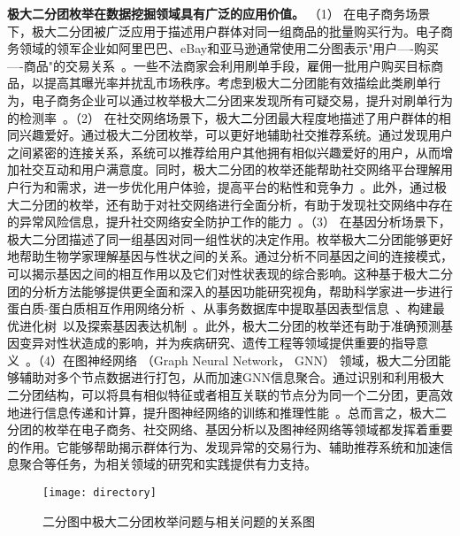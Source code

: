 \textbf{极大二分团枚举在数据挖掘领域具有广泛的应用价值。} （1） 在电子商务场景下，极大二分团被广泛应用于描述用户群体对同一组商品的批量购买行为。电子商务领域的领军企业如阿里巴巴、eBay和亚马逊通常使用二分图表示"用户----购买----商品"的交易关系~\cite{MEB20}。一些不法商家会利用刷单手段，雇佣一批用户购买目标商品，以提高其曝光率并扰乱市场秩序。考虑到极大二分团能有效描绘此类刷单行为，电子商务企业可以通过枚举极大二分团来发现所有可疑交易，提升对刷单行为的检测率~\cite{clickfarm21,MEB20,MEB22,skylinechinese23}。（2） 在社交网络场景下，极大二分团最大程度地描述了用户群体的相同兴趣爱好。通过极大二分团枚举，可以更好地辅助社交推荐系统。通过发现用户之间紧密的连接关系，系统可以推荐给用户其他拥有相似兴趣爱好的用户，从而增加社交互动和用户满意度。同时，极大二分团的枚举还能帮助社交网络平台理解用户行为和需求，进一步优化用户体验，提高平台的粘性和竞争力~\cite{minel06,MBEchinese17}。此外，通过极大二分团的枚举，还有助于对社交网络进行全面分析，有助于发现社交网络中存在的异常风险信息，提升社交网络安全防护工作的能力~\cite{dangerous19,dangerous05}。（3） 在基因分析场景下，极大二分团描述了同一组基因对同一组性状的决定作用。枚举极大二分团能够更好地帮助生物学家理解基因与性状之间的关系。通过分析不同基因之间的连接模式，可以揭示基因之间的相互作用以及它们对性状表现的综合影响。这种基于极大二分团的分析方法能够提供更全面和深入的基因功能研究视角，帮助科学家进一步进行蛋白质-蛋白质相互作用网络分析~\cite{protein11}、从事务数据库中提取基因表型信息~\cite{gene11}、构建最优进化树~\cite{tree04}以及探索基因表达机制~\cite{geneexp11}。此外，极大二分团的枚举还有助于准确预测基因变异对性状造成的影响，并为疾病研究、遗传工程等领域提供重要的指导意义~\cite{gene22,iMBEA14,protein21}。（4）在图神经网络 （Graph Neural Network， GNN） 领域，极大二分团能够辅助对多个节点数据进行打包，从而加速GNN信息聚合。通过识别和利用极大二分团结构，可以将具有相似特征或者相互关联的节点分为同一个二分团，更高效地进行信息传递和计算，提升图神经网络的训练和推理性能~\cite{Pqbiclique21,Pqbiclique23,Pq23}。总而言之，极大二分团的枚举在电子商务、社交网络、基因分析以及图神经网络等领域都发挥着重要的作用。它能够帮助揭示群体行为、发现异常的交易行为、辅助推荐系统和加速信息聚合等任务，为相关领域的研究和实践提供有力支持。

\begin{figure} [t]
  \centering
  \vspace{0.1in}
  \texttt{[image: directory]}
  \vspace{0.1in}
  \caption{二分图中极大二分团枚举问题与相关问题的关系图}
  \label{fig:directory}
\end{figure}

